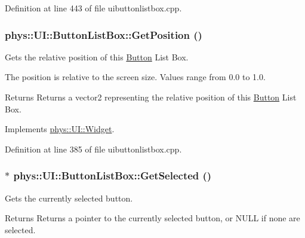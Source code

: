 Definition at line 443 of file uibuttonlistbox.cpp.

\hypertarget{classphys_1_1UI_1_1ButtonListBox_ab7834542f8940adba8df6b1eace92e95}{
\subsubsection[{GetPosition}]{ phys::UI::ButtonListBox::GetPosition ()}}
\label{d4/dd7/classphys_1_1UI_1_1ButtonListBox_ab7834542f8940adba8df6b1eace92e95}


Gets the relative position of this \hyperlink{classphys_1_1UI_1_1Button}{Button} List Box. 

The position is relative to the screen size. Values range from 0.0 to 1.0. \begin{DoxyReturn}{Returns}
Returns a vector2 representing the relative position of this \hyperlink{classphys_1_1UI_1_1Button}{Button} List Box. 
\end{DoxyReturn}


Implements \hyperlink{classphys_1_1UI_1_1Widget_a3e464b028b0d1b5755923b8790260c33}{phys::UI::Widget}.



Definition at line 385 of file uibuttonlistbox.cpp.

\hypertarget{classphys_1_1UI_1_1ButtonListBox_a2774799b087576f9085c0d713c129e76}{
\subsubsection[{GetSelected}]{ $\ast$ phys::UI::ButtonListBox::GetSelected ()}}
\label{d4/dd7/classphys_1_1UI_1_1ButtonListBox_a2774799b087576f9085c0d713c129e76}


Gets the currently selected button. 

\begin{DoxyReturn}{Returns}
Returns a pointer to the currently selected button, or NULL if none are selected. 
\end{DoxyReturn}


